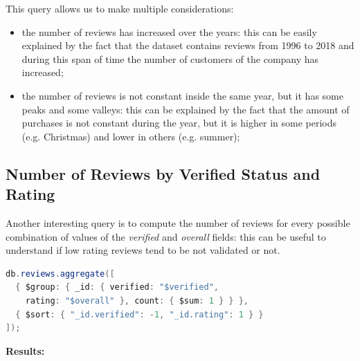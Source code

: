 \newpage
This query allows us to make multiple considerations:
\begin{itemize}
    \item the number of reviews has increased over the years: this can be easily explained by the fact that the dataset contains reviews from 1996 to 2018 and during this span of time the number of customers of the company has increased;
    \item the number of reviews is not constant inside the same year, but it has some peaks and some valleys: this can be explained by the fact that the amount of purchases is not constant during the year, but it is higher in some periods (e.g. Christmas) and lower in others (e.g. summer);
\end{itemize}

\newpage
\subsection{Number of Reviews by Verified Status and Rating}
Another interesting query is to compute the number of reviews for every possible combination of values of the \textit{verified} and \textit{overall} fields: this can be useful to understand if low rating reviews tend to be not validated or not. \\
\begin{lstlisting}[language=Java]
db.reviews.aggregate([
  { $group: { _id: { verified: "$verified", 
    rating: "$overall" }, count: { $sum: 1 } } },
  { $sort: { "_id.verified": -1, "_id.rating": 1 } }
]);
\end{lstlisting}
\textbf{Results:}
